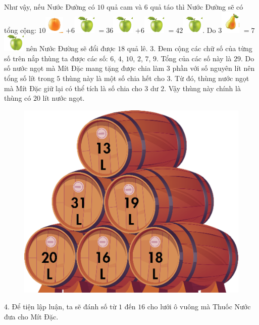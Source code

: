 \vskip 0.1cm
Như vậy, nếu Nước Đường có $10$ quả cam và $6$ quả táo thì Nước Đường sẽ có tổng cộng:
\vskip 0.1cm
$10$\includegraphics{6}  $+ 6$\includegraphics{5}  $= 36$\includegraphics{5}  $+ 6$\includegraphics{5}  $= 42$\includegraphics{5}.
\vskip 0.1cm
Do $3$\includegraphics{4}  $= 7$\includegraphics{5}  nên Nước Đường sẽ đổi được $18$ quả lê.
\vskip 0.1cm
$3.$
\vskip 0.1cm
Đem cộng các chữ số của từng số trên nắp thùng ta được các số: $6$, $4$, $10$, $2$, $7$, $9$. Tổng của các số này là $29$. Do số nước ngọt mà Mít Đặc mang tặng được chia làm $3$ phần với số nguyên lít nên tổng số lít trong $5$ thùng này là một số chia hết cho $3$. Từ đó, thùng nước ngọt mà Mít Đặc giữ lại có thể tích là số chia cho $3$ dư $2$. Vậy thùng này chính là thùng có $20$ lít nước ngọt.
\begin{figure}[H]
	\centering
	\vspace*{-5pt}
	\captionsetup{labelformat= empty, justification=centering}
	\includegraphics[width=0.3\linewidth]{7}
	\vspace*{-15pt}
\end{figure}
$4.$ Để tiện lập luận, ta sẽ đánh số từ $1$ đến $16$ cho lưới ô vuông mà Thuốc Nước đưa cho Mít Đặc.
